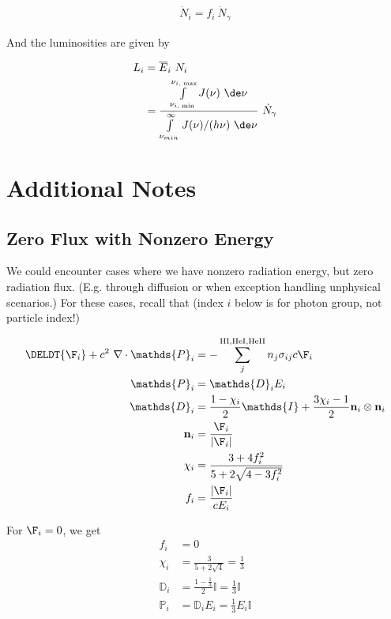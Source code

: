 \begin{align}
\dot{N}_i = f_i\ \dot{N}_\gamma
\end{align}

And the luminosities are given by

\begin{align}
	L_i &= \overline{E}_i \ N_i \\
			&= \frac{\int\limits_{\nu_{i \text{, min}}}^{\nu_{i \text{, max}}} J(\nu) \ \de \nu }{\int\limits_{\nu_{min}}^{\infty} J(\nu) / (h \nu) \ \de \nu} \ \dot{N}_\gamma
\end{align}




\section{Additional Notes}

\subsection{Zero Flux with Nonzero Energy}

We could encounter cases where we have nonzero radiation energy, but zero
radiation flux. (E.g. through diffusion or when exception handling unphysical
scenarios.) For these cases, recall that (index $i$ below is for photon group,
not particle index!)

\begin{align}
	\DELDT{\F_i} + c^2 \ \nabla \cdot \mathds{P}_i &=
		- \sum\limits_{j}^{\mathrm{HI, HeI, HeII}} n_j \sigma_{i j} c \F_i \\
	\mathds{P}_i &=
		\mathds{D}_i E_i \\
	\mathds{D}_i &=
		\frac{1- \chi_i}{2} \mathds{I} + \frac{3 \chi_i - 1}{2} \mathbf{n}_i \otimes \mathbf{n}_i\\
	\mathbf{n}_i &=
		\frac{\F_i}{|\F_i|} \\
	\chi_i &=
		\frac{3 + 4 f_i ^2}{5 + 2 \sqrt{4 - 3 f_i^2}} \\
	f_i &=
		\frac{|\F_i|}{c E_i}
\end{align}

For $\F_i = 0$, we get
\begin{align}
	f_i &= 0 \\
	\chi_i &= \frac{3}{5 + 2 \sqrt{4}} = \frac{1}{3} \\
	\mathds{D}_i &= \frac{1- \frac{1}{3}}{2} \mathds{I} = \frac{1}{3} \mathds{I} \\
	\mathds{P}_i &= \mathds{D}_i E_i =  \frac{1}{3} E_i \mathds{I}
\end{align}

